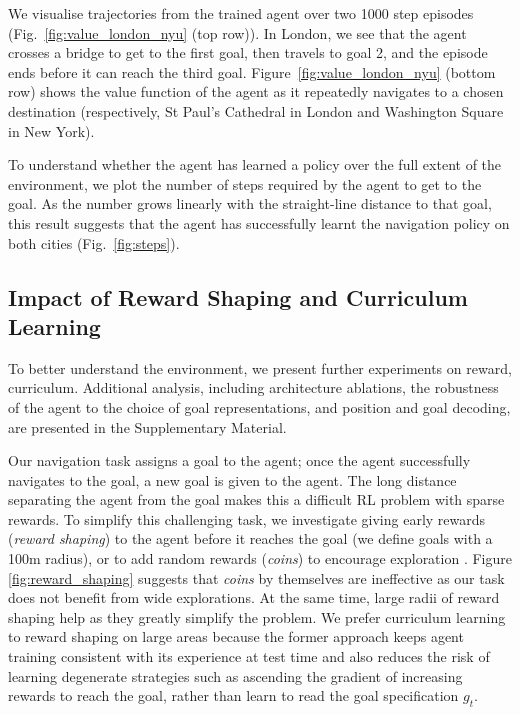 We visualise trajectories from the trained agent over two 1000 step episodes (Fig.~\ref{fig:value_london_nyu} (top row)). In London, we see that the agent crosses a bridge to get to the first goal, then travels to goal 2, and the episode ends before it can reach the third goal. Figure~\ref{fig:value_london_nyu} (bottom row) shows the value function of the agent as it repeatedly navigates to a chosen destination (respectively, St Paul's Cathedral in London and Washington Square in New York). 

To understand whether the agent has learned a policy over the full extent of the environment, we plot the number of steps required by the agent to get to the goal. As the number grows linearly with the straight-line distance to that goal, this result suggests that the agent has successfully learnt the navigation policy on both cities (Fig.~\ref{fig:steps}). 




\subsection{Impact of Reward Shaping and Curriculum Learning}
\label{sec:shaping}
To better understand the environment, we present further experiments on reward, curriculum. Additional analysis, including architecture ablations, the robustness of the agent to the choice of goal representations, and position and goal decoding, are presented in the Supplementary Material.

Our navigation task assigns a goal to the agent; once the agent successfully navigates to the goal, a new goal is given to the agent. The long distance separating the agent from the goal makes this a difficult RL problem with sparse rewards. To simplify this challenging task, we investigate giving early rewards (\emph{reward shaping}) to the agent before it reaches the goal (we define goals with a 100m radius), or to add random rewards (\emph{coins}) to encourage exploration \cite{beattie2016deepmind,mirowski2016learning}. Figure \ref{fig:reward_shaping} suggests that \emph{coins} by themselves are ineffective as our task does not benefit from wide explorations. At the same time, large radii of reward shaping help as they greatly simplify the problem. We prefer curriculum learning to reward shaping on large areas because the former approach keeps agent training consistent with its experience at test time and also reduces the risk of learning degenerate strategies such as ascending the gradient of increasing rewards to reach the goal, rather than learn to read the goal specification $g_t$.

